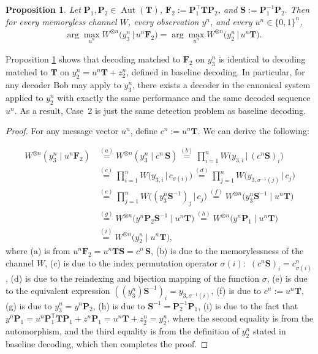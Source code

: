 \documentclass[onecolumn]{IEEEtran} %
\newcommand{\bP}{\mathbf P}
\newcommand{\bF}{\mathbf F}
\newcommand{\bS}{\mathbf S}
\newcommand{\1}{\mathbbm{1}}
\DeclareMathOperator{\Aut}{Aut}
\theoremstyle{boldremark}
\newtheorem{proposition}{Proposition}
\newcommand{\bT}{\mathbf{T}}
\begin{document}
\begin{proposition}\label{prop:C3toC1-clean}
Let $\bP_1,\bP_2\in\Aut(\bT)$, $\bF_2 := \bP_1^{\!\top}\bT\bP_2$, and $ \bS := \bP_1^{-1}\bP_2.$ Then for every memoryless channel $W$, every observation $y^n$, and every $u^n\in\{0,1\}^n$,
\begin{align}
&\arg\max_{u^n} W^{\otimes n}\!\big(y_3^n \,\big|\, u^n\bF_2\big)=\arg\max_{u^n} W^{\otimes n}\!\big(y_2^n \,\big|\, u^n\bT\big).
\end{align}
\end{proposition}

Proposition \ref{prop:C3toC1-clean} shows that decoding matched to $\bF_2$ on $y_3^n$ is {identical} to decoding matched to $\bT$ on $y_2^n=u^n\bT+z_2^n$, defined in baseline decoding. In particular, for any decoder Bob may apply to $y_3^n$, there exists a decoder in the canonical system applied to 
$y_2^n$ with exactly the same performance and the same decoded sequence $u^n$. As a result, Case~2 is just the same detection problem as baseline decoding.


\begin{proof}
For any message vector $u^n$, define $c^n:= u^n\bT$. We can derive the following:

\begin{align}
W^{\otimes n}(y_3^n\mid u^n\bF_2)
&\overset{(a)}= W^{\otimes n}(y_3^n\mid c^n\,\bS) \overset{(b)}= \prod_{i=1}^n W\!\big( y_{3,i} \,\big|\, (c^n\bS)_i \big) \\
&\overset{(c)}= \prod_{i=1}^n W\!\big( y_{3,i} \,\big|\, c_{\sigma(i)} \big) \overset{(d)}= \prod_{j=1}^n W\!\big( y_{3,\sigma^{-1}(j)} \,\big|\, c_j \big) \\
&\overset{(e)}= \prod_{j=1}^n W\!\big( (y_3^n\bS^{-1})_j \,\big|\, c_j \big) \overset{(f)}= W^{\otimes n}\!\big(y_3^n\bS^{-1}\mid u^n\bT\big)\\
&\overset{(g)}=  W^{\otimes n}\!\big(y^n\bP_2\bS^{-1}\mid u^n\bT\big)\overset{(h)}=W^{\otimes n}\!\big(y^n\bP_1\mid u^n\bT\big)\\
&\overset{(i)}=  W^{\otimes n}\!\big(y_2^n\mid u^n\bT\big),
\end{align}
where (a) is from $u^n\bF_2=u^n\bT\bS=c^n\,\bS$, (b) is due to the memorylessness of the channel $W$, (c) is due to the index permutation operator $\sigma(i):\,\,(c^n\bS)_i=c^n_{\sigma(i)}$, (d) is due to the reindexing and bijection mapping of the function $\sigma$, (e) is due to the equivalent expression $((y_3^n)\bS^{-1})_i = y_{3,\sigma^{-1}(i)}$, (f) is due to $c^n:= u^n\bT$, (g) is due to $y_3^n=y^n\bP_2$, (h) is due to $\bS^{-1}=\bP_2^{-1}\bP_1$, (i) is due to the fact that $y^n\bP_1=u^n\bP_1^{\mathsf T}\bT\bP_1+z^n\bP_1=u^n\bT+z_2^n=y_2^n$, where the second equality is from the automorphism, and the third equality is from the definition of $y_2^n$ stated in baseline decoding, which then completes the proof.
\end{proof}
\end{document}
